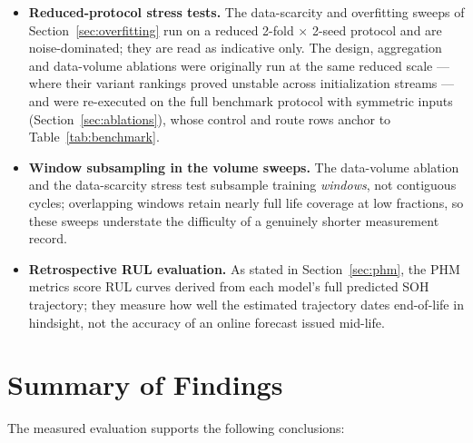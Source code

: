 \begin{itemize}
    model's PHM average. This affects all models symmetrically but means the PHM
    columns average over slightly different fold subsets. Post-EOL cycles are
    masked (Section~\ref{sec:phm}).
    \item \textbf{Reduced-protocol stress tests.} The data-scarcity and
    overfitting sweeps of Section~\ref{sec:overfitting} run on a reduced
    2-fold $\times$ 2-seed protocol and are noise-dominated; they are read as
    indicative only. The design, aggregation and data-volume ablations were
    originally run at the same reduced scale --- where their variant rankings
    proved unstable across initialization streams --- and were re-executed on
    the full benchmark protocol with symmetric inputs
    (Section~\ref{sec:ablations}), whose control and route rows anchor to
    Table~\ref{tab:benchmark}.
    \item \textbf{Window subsampling in the volume sweeps.} The data-volume
    ablation and the data-scarcity stress test subsample training
    \emph{windows}, not contiguous cycles; overlapping windows retain nearly
    full life coverage at low fractions, so these sweeps understate the
    difficulty of a genuinely shorter measurement record.
    \item \textbf{Retrospective RUL evaluation.} As stated in
    Section~\ref{sec:phm}, the PHM metrics score RUL curves derived from each
    model's full predicted SOH trajectory; they measure how well the estimated
    trajectory dates end-of-life in hindsight, not the accuracy of an online
    forecast issued mid-life.
\end{itemize}

\section{Summary of Findings}
\label{sec:results_summary}

The measured evaluation supports the following conclusions:

